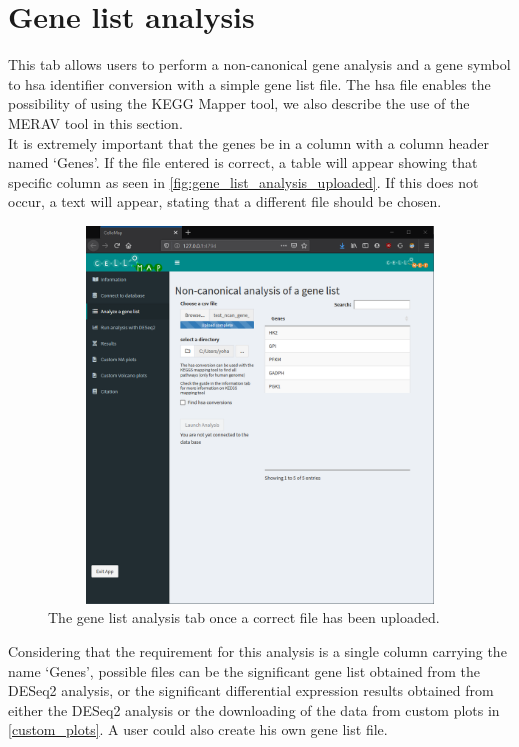 \documentclass[11pt]{article}
\begin{document}
\section{Gene list analysis \label{gene_list_analysis}}
This tab allows users to perform a non-canonical gene analysis and a gene symbol to \acrshort{hsa} identifier conversion with a simple gene list file. The \acrshort{hsa} file enables the possibility of using the \acrshort{KEGG} Mapper tool, we also describe the use of the \acrshort{MERAV} tool in this section.\\
It is extremely important that the genes be in a column with a column header named `Genes'. If the file entered is correct, a table will appear showing that specific column as seen in \autoref{fig:gene_list_analysis_uploaded}. If this does not occur, a text will appear, stating that a different file should be chosen.
\begin{figure}[h!]
\centering
\includegraphics[width=15cm,height=10cm,keepaspectratio]{gene_list_analysis.png}
\caption{The gene list analysis tab once a correct file has been uploaded.}
\label{fig:gene_list_analysis_uploaded}
\end{figure}

Considering that the requirement for this analysis is a single column carrying the name `Genes', possible files can be the significant gene list obtained from the \acrshort{DESeq2} analysis, or the significant differential expression results obtained from either the \acrshort{DESeq2} analysis or the downloading of the data from custom plots in \autoref{custom_plots}. A user could also create his own gene list file.
\end{document}
